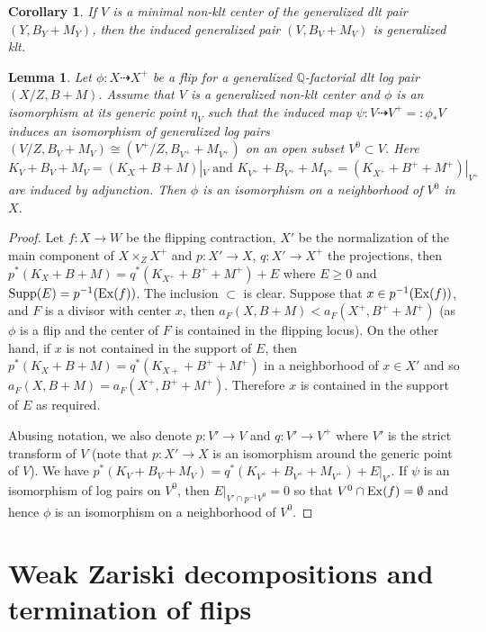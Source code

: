 \documentclass{amsart}
\renewcommand{\qq}{\mathbb{Q}}
\newtheorem{lemma}[theorem]{Lemma}
\newtheorem{corollary}[theorem]{Corollary}
\theoremstyle{remark}
\numberwithin{equation}{section}
\begin{document}
\begin{corollary}
If $V$ is a minimal non-klt center of the generalized dlt pair $(Y,B_Y+M_Y)$,
then the induced generalized pair $(V,B_V+M_V)$ is generalized klt.
\end{corollary}
\begin{lemma}\label{l-g}
Let $\phi: X\dasharrow X^+$ be a flip for a generalized $\qq$-factorial dlt log pair $(X/Z,B+M)$. Assume that $V$ is a generalized non-klt center and $\phi$ is an isomorphism at its generic point $\eta _V$ such that the induced map $\psi : V\dasharrow V^+=:\phi _* V$ induces an isomorphism of generalized log pairs $(V/Z,B_V+M_V)\cong (V^+/Z,B_{V^+}+M_{V^+})$ on an open subset $V^0\subset V$. Here 
\[
K_V+B_V+M_V=(K_X+B+M)|_V  \text{ and } K_{V^+}+B_{V^+}+M_{V^+}=(K_{X^+}+B^+ +M^+)|_{V^+}
\] 
are induced by adjunction. Then $\phi$ is an isomorphism on a neighborhood of $V^0$ in $X$.

\end{lemma}
\begin{proof} Let $f:X\to W$ be the flipping contraction,  $X'$ be the normalization of the main component of $X\times _Z X^+$ and $p:X'\to X$, $q:X'\to X^+$ the projections, then $p^*(K_X+B+M)=q^*(K_{X^+}+B^++M^+)+E$ where $E\geq 0$ and  ${\rm Supp }(E)=p^{-1}({\rm Ex}(f))$. 
The inclusion $\subset$ is clear. Suppose that $x\in p^{-1}({\rm Ex}(f))$, and $F$ is a divisor with center $x$, then $a_F(X,B+M)<a_F(X^+,B^++M^+)$ (as $\phi$ is a flip and the center of $F$ is contained in the flipping locus). On the other hand,
if $x$ is not contained in the support of $E$, then $p^*(K_X+B+M)=q^*(K_{X+}+B^++M^+)$ in a neighborhood of $x\in X'$ and so $a_F(X,B+M)=a_F(X^+,B^++M^+)$. Therefore $x$ is contained in the support of $E$ as required.

Abusing notation, we also denote $p:V'\to V$ and $q:V'\to V^+$ where $V'$ is the strict transform of $V$ (note that $p:X'\to X$ is an isomorphism around the generic point of $V$).
We have $p^*(K_V+B_V+M_V)=q^*(K_{V^+}+B_{V^+}+M_{V^+})+E|_{V'}$. If $\psi$ is an isomorphism of log pairs on $V^0$, then 
$E|_{V'\cap p^{-1}V^0}=0$ so that $V^0\cap {\rm Ex}(f)=\emptyset$ and hence $\phi$ is an isomorphism on a neighborhood of $V^0$.
\end{proof}

\section{Weak Zariski decompositions and termination of flips} 
\end{document}
